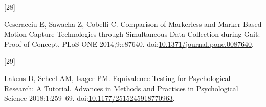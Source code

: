\documentclass[]{elsarticle} %
\newlength{\cslhangindent}
\newlength{\csllabelwidth}
\newlength{\cslentryspacingunit} %
\newenvironment{CSLReferences}[2] %
 {%
  \setlength{\parindent}{0pt}
  \ifodd #1
  \let\oldpar\par
  \def\par{\hangindent=\cslhangindent\oldpar}
  \fi
  \setlength{\parskip}{#2\cslentryspacingunit}
 }%
 {}
\newcommand{\CSLLeftMargin}[1]{\parbox[t]{\csllabelwidth}{#1}}
\newcommand{\CSLRightInline}[1]{\parbox[t]{\linewidth - \csllabelwidth}{#1}\break}
\begin{document}
\begin{CSLReferences}{0}{0}
\leavevmode{}%
\CSLLeftMargin{{[}28{]} }
\CSLRightInline{Ceseracciu E, Sawacha Z, Cobelli C. {Comparison of
Markerless and Marker-Based Motion Capture Technologies through
Simultaneous Data Collection during Gait: Proof of Concept}. PLoS ONE
2014;9:e87640.
doi:\href{https://doi.org/10.1371/journal.pone.0087640}{10.1371/journal.pone.0087640}.}

\leavevmode{}%
\CSLLeftMargin{{[}29{]} }
\CSLRightInline{Lakens D, Scheel AM, Isager PM. {Equivalence Testing for
Psychological Research: A Tutorial}. Advances in Methods and Practices
in Psychological Science 2018;1:259--69.
doi:\href{https://doi.org/10.1177/2515245918770963}{10.1177/2515245918770963}.}

\end{CSLReferences}
\end{document}
